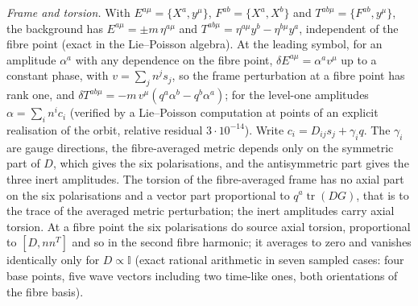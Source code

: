 \emph{Frame and torsion.} With \(E^{a\mu}=\{X^a,y^\mu\}\), \(F^{ab}=\{X^a,X^b\}\) and \(T^{ab\mu}=\{F^{ab},y^\mu\}\), the background has \(E^{a\mu}=\pm m\,\eta^{a\mu}\) and \(T^{ab\mu}=\eta^{a\mu}y^b-\eta^{b\mu}y^a\), independent of the fibre point (exact in the Lie--Poisson algebra). At the leading symbol, for an amplitude \(\alpha^a\) with any dependence on the fibre point, \(\delta E^{a\mu}=\alpha^a v^\mu\) up to a constant phase, with \(v=\sum_jn^js_j\), so the frame perturbation at a fibre point has rank one, and \(\delta T^{ab\mu}=-m\,v^\mu(q^a\alpha^b-q^b\alpha^a)\); for the level-one amplitudes \(\alpha=\sum_in^ic_i\) (verified by a Lie--Poisson computation at points of an explicit realisation of the orbit, relative residual \(3\cdot10^{-14}\)). Write \(c_i=D_{ij}s_j+\gamma_iq\). The \(\gamma_i\) are gauge directions, the fibre-averaged metric depends only on the symmetric part of \(D\), which gives the six polarisations, and the antisymmetric part gives the three inert amplitudes. The torsion of the fibre-averaged frame has no axial part on the six polarisations and a vector part proportional to \(q^a\operatorname{tr}(DG)\), that is to the trace of the averaged metric perturbation; the inert amplitudes carry axial torsion. At a fibre point the six polarisations do source axial torsion, proportional to \([D,nn^{T}]\) and so in the second fibre harmonic; it averages to zero and vanishes identically only for \(D\propto\mathbb I\) (exact rational arithmetic in seven sampled cases: four base points, five wave vectors including two time-like ones, both orientations of the fibre basis).

